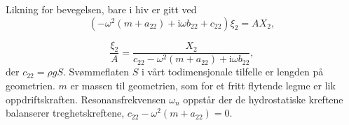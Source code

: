 Likning for bevegelsen, bare i hiv er gitt ved
\begin{equation}
( - \omega^2(m+a_{22}) + \mathrm{i}\omega b_{22}+ c_{22})\xi_2 = AX_2, 
\end{equation}

\begin{equation}
\frac{\xi_2^{}}{A} = \frac{X_2}{c_{22} - \omega^2(m+a_{22}) + \mathrm{i}\omega b_{22}}, 
\end{equation}
der $c_22 = \rho g S$. Svømmeflaten $S$ i vårt todimensjonale tilfelle er lengden på geometrien. $m$ er massen til geometrien, som for et fritt flytende legme er lik oppdriftskraften. Resonansfrekvensen $\omega_n$ oppstår der de hydrostatiske kreftene balanserer treghetskreftene, $c_{22}-\omega^2(m+a_{22}) = 0$. 